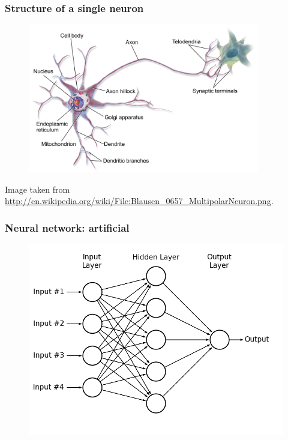 \begin{frame}
	\frametitle{Structure of a single neuron}
	\begin{figure}[!h]
		\centering
		\includegraphics[width=0.9\textwidth]{img/Blausen_0657_MultipolarNeuron.png}
	\end{figure}
	\tiny{Image taken from \url{http://en.wikipedia.org/wiki/File:Blausen_0657_MultipolarNeuron.png}}.
\end{frame}


\begin{frame}
	\frametitle{Neural network: artificial}
	\begin{figure}[!h]
		\centering
		\includegraphics[width=\textwidth]{img/fig_neural_network_1.png}
	\end{figure}
\end{frame}



